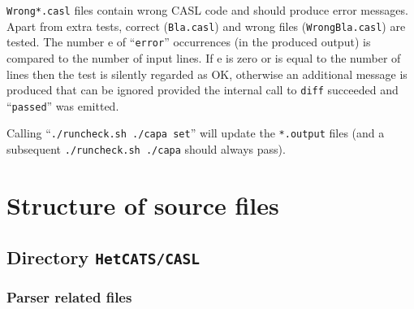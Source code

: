 \documentclass{article}
\begin{document}
\texttt{Wrong*.casl} files contain wrong CASL code and should produce
error messages. Apart from extra tests, correct (\texttt{Bla.casl})
and wrong files (\texttt{WrongBla.casl}) are tested. The number e of
``\texttt{error}'' occurrences (in the produced output) is compared to the
number of input lines. If e is zero or is equal to the number of lines
then the test is silently regarded as OK, otherwise an additional message
is produced that can be ignored provided the internal call to
\texttt{diff} succeeded and ``\texttt{passed}'' was emitted.

Calling ``\texttt{./runcheck.sh ./capa set}'' will update the \texttt{*.output} files (and a subsequent \texttt{./runcheck.sh ./capa} should always pass).

\section{Structure of source files}

\subsection{Directory \texttt{HetCATS/CASL}}

\subsubsection*{Parser related files}
\end{document}
